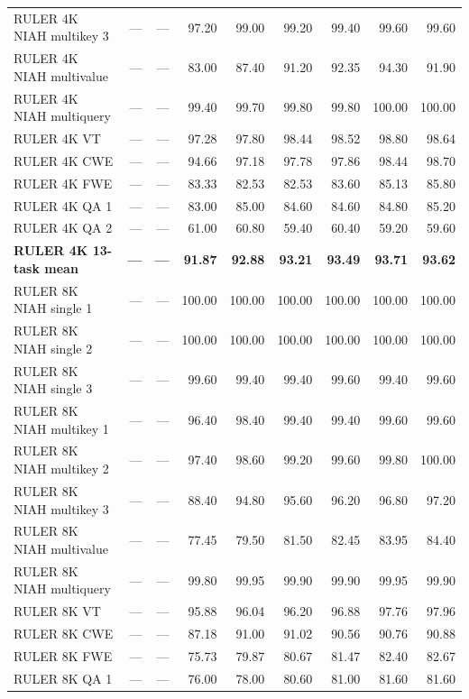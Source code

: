 \begin{longtable}{@{}lrrrrrrrr@{}}
RULER 4K NIAH multikey 3 & --- & --- & 97.20 & 99.00 & 99.20 & 99.40 & 99.60 & 99.60 \\
RULER 4K NIAH multivalue & --- & --- & 83.00 & 87.40 & 91.20 & 92.35 & 94.30 & 91.90 \\
RULER 4K NIAH multiquery & --- & --- & 99.40 & 99.70 & 99.80 & 99.80 & 100.00 & 100.00 \\
RULER 4K VT & --- & --- & 97.28 & 97.80 & 98.44 & 98.52 & 98.80 & 98.64 \\
RULER 4K CWE & --- & --- & 94.66 & 97.18 & 97.78 & 97.86 & 98.44 & 98.70 \\
RULER 4K FWE & --- & --- & 83.33 & 82.53 & 82.53 & 83.60 & 85.13 & 85.80 \\
RULER 4K QA 1 & --- & --- & 83.00 & 85.00 & 84.60 & 84.60 & 84.80 & 85.20 \\
RULER 4K QA 2 & --- & --- & 61.00 & 60.80 & 59.40 & 60.40 & 59.20 & 59.60 \\
\hline
\textbf{RULER 4K 13-task mean} & \textbf{---} & \textbf{---} & \textbf{91.87} & \textbf{92.88} & \textbf{93.21} & \textbf{93.49} & \textbf{93.71} & \textbf{93.62} \\
\hline
RULER 8K NIAH single 1 & --- & --- & 100.00 & 100.00 & 100.00 & 100.00 & 100.00 & 100.00 \\
RULER 8K NIAH single 2 & --- & --- & 100.00 & 100.00 & 100.00 & 100.00 & 100.00 & 100.00 \\
RULER 8K NIAH single 3 & --- & --- & 99.60 & 99.40 & 99.40 & 99.60 & 99.40 & 99.60 \\
RULER 8K NIAH multikey 1 & --- & --- & 96.40 & 98.40 & 99.40 & 99.40 & 99.60 & 99.60 \\
RULER 8K NIAH multikey 2 & --- & --- & 97.40 & 98.60 & 99.20 & 99.60 & 99.80 & 100.00 \\
RULER 8K NIAH multikey 3 & --- & --- & 88.40 & 94.80 & 95.60 & 96.20 & 96.80 & 97.20 \\
RULER 8K NIAH multivalue & --- & --- & 77.45 & 79.50 & 81.50 & 82.45 & 83.95 & 84.40 \\
RULER 8K NIAH multiquery & --- & --- & 99.80 & 99.95 & 99.90 & 99.90 & 99.95 & 99.90 \\
RULER 8K VT & --- & --- & 95.88 & 96.04 & 96.20 & 96.88 & 97.76 & 97.96 \\
RULER 8K CWE & --- & --- & 87.18 & 91.00 & 91.02 & 90.56 & 90.76 & 90.88 \\
RULER 8K FWE & --- & --- & 75.73 & 79.87 & 80.67 & 81.47 & 82.40 & 82.67 \\
RULER 8K QA 1 & --- & --- & 76.00 & 78.00 & 80.60 & 81.00 & 81.60 & 81.60 \\

\end{longtable}
